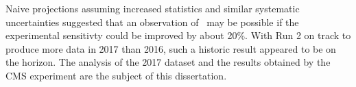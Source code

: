 Naive projections assuming increased statistics and similar systematic uncertainties suggested that an observation of \VHbb\ may be possible if the experimental sensitivty could be improved by about 20\%. With Run 2 on track to produce more data in 2017 than 2016, such a historic result appeared to be on the horizon. The analysis of the 2017 dataset and the results obtained by the CMS experiment are the subject of this dissertation.



%
%
%

